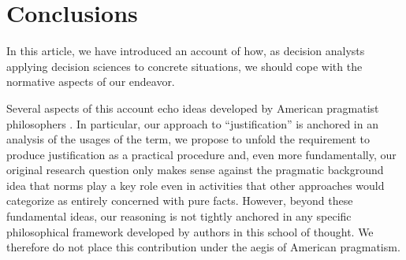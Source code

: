 \documentclass[preprint, french, english, 11pt, authoryear]{elsarticle}%
\newcommand{\acp}[1]{#1s}
\begin{document}
\section{Conclusions}
\label{sec:concl}
In this article, we have introduced an account of how, as decision analysts applying decision sciences to concrete situations, we should cope with the normative aspects of our endeavor. %
\begin{changebar}Several aspects of this account echo ideas developed by American pragmatist philosophers \citep{ormerod_history_2006}. 
In particular, our approach to ``justification'' is anchored in an analysis of the usages of the term, we propose to unfold the requirement to produce justification as a practical procedure and, even more fundamentally, 
our original research question only makes sense against the pragmatic background idea that norms play a key role even in activities that other approaches would categorize as entirely concerned with pure facts.
However, beyond these fundamental ideas, our reasoning is not tightly anchored in any specific philosophical framework developed by authors in this school of thought.
We therefore do not place this contribution under the aegis of American pragmatism.
\end{changebar}

\end{document}

